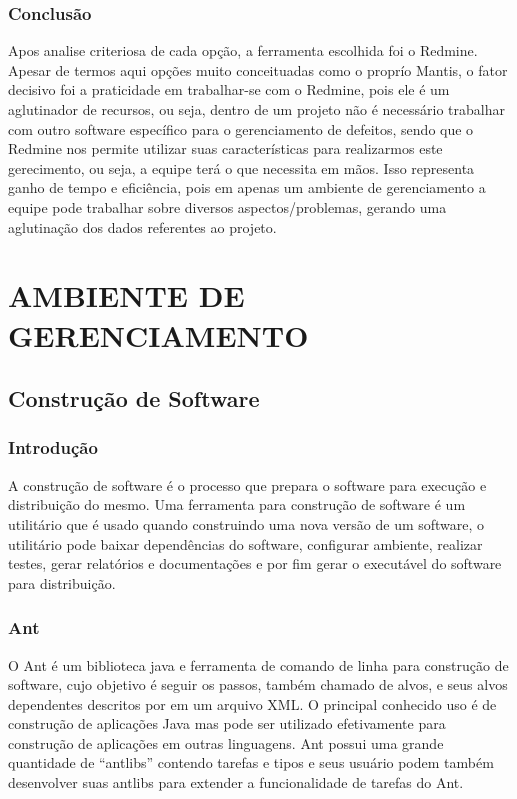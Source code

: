 \documentclass[12pt,a4paper]{article}
\begin{document}
		
		\subsubsection{Conclusão}
		
			Apos analise criteriosa de cada opção, a ferramenta escolhida foi o Redmine. 
			Apesar de termos aqui opções muito conceituadas como o proprío Mantis, o fator decisivo foi a praticidade em trabalhar-se com o Redmine, 
			pois ele é um aglutinador de recursos, ou seja, dentro de um projeto não é necessário trabalhar com outro software específico para o gerenciamento de defeitos, 
			sendo que o Redmine nos permite utilizar suas características para realizarmos este gerecimento, ou seja, a equipe terá o que necessita em mãos. 
			Isso representa ganho de tempo e eficiência, pois em apenas um ambiente de gerenciamento a equipe pode trabalhar sobre diversos aspectos/problemas, 
			gerando uma aglutinação dos dados referentes ao projeto.
		
				

\clearpage		
\section{AMBIENTE DE GERENCIAMENTO}

	\subsection{Construção de Software}
	
		\subsubsection{Introdução}
		
			A construção de software é o processo que prepara o software para execução e distribuição do mesmo. Uma ferramenta
			para construção de software é um utilitário que é usado quando construindo uma nova versão de um software, o
			utilitário pode baixar dependências do software, configurar ambiente, realizar testes, gerar relatórios e
			documentações e por fim gerar o executável do software para distribuição.
			
		\subsubsection{Ant}
		
			O Ant é um biblioteca java e ferramenta de comando de linha para construção de software, cujo objetivo é seguir os
			passos, também chamado de alvos, e seus alvos dependentes descritos por em um arquivo XML. O principal conhecido uso
			é de construção de aplicações Java mas pode ser utilizado efetivamente para construção de aplicações em outras
			linguagens. Ant possui uma grande quantidade de ``antlibs'' contendo tarefas e tipos e seus usuário podem também
			desenvolver suas antlibs para extender a funcionalidade de tarefas do Ant.
			
\end{document}
